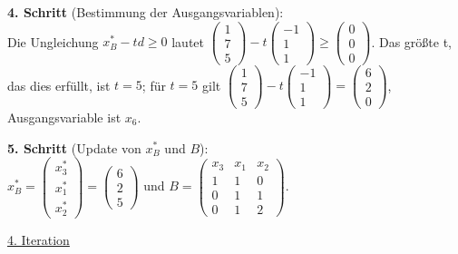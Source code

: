 \documentclass[10pt,a4paper,oneside,ngerman,numbers=noenddot]{scrartcl}
\begin{document}
		\textbf{4. Schritt} (Bestimmung der Ausgangsvariablen):\\
		Die Ungleichung $x_{B}^{*} - td \geq 0$ lautet $\begin{pmatrix} 1 \\ 7 \\ 5\end{pmatrix} - t \begin{pmatrix}-1 \\ 1 \\ 1 \end{pmatrix} \geq \begin{pmatrix} 0 \\ 0 \\ 0 \end{pmatrix}$. Das größte t, das dies erfüllt, ist $t = 5$; für $t = 5$ gilt $\begin{pmatrix} 1 \\ 7 \\ 5\end{pmatrix} - t \begin{pmatrix} -1 \\ 1 \\ 1 \end{pmatrix} = \begin{pmatrix} 6 \\ 2 \\ 0 \end{pmatrix}$, Ausgangsvariable ist $x_{6}$.
		
		\textbf{5. Schritt} (Update von $x_{B}^{*}$ und $B$):\\
		$x_{B}^{*} = \begin{pmatrix} x_{3}^{*} \\ x_{1}^{*} \\ x_{2}^{*} \end{pmatrix} = \begin{pmatrix} 6 \\ 2 \\ 5 \end{pmatrix}$ und $B = \begin{pmatrix} x_{3} & x_{1} & x_{2} \\ 1 & 1 & 0 \\ 0 & 1 & 1 \\ 0 & 1 & 2 \end{pmatrix}$.
		
		\underline{4. Iteration}
		
\end{document}
